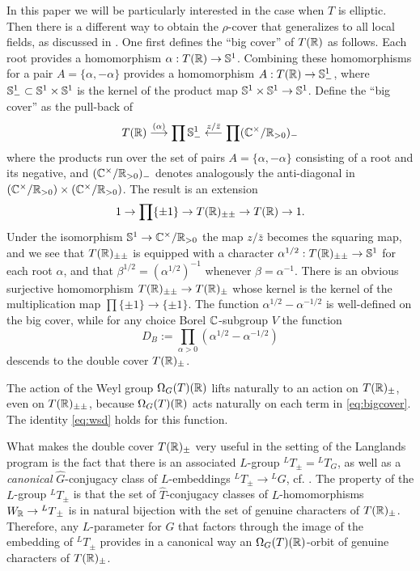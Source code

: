 \documentclass{article}
\theoremstyle{definition}
\numberwithin{equation}{section}
\renewcommand{\-}{\hyp{}}
\begin{document}
In this paper we will be particularly interested in the case when $T$ is elliptic. Then there is a different way to obtain the $\rho$-cover that generalizes to all local fields, as discussed in \cite{KalDC}. One first defines the ``big cover'' of $T(\mathbb{R})$ as follows. Each root provides a homomorphism $\alpha : T(\mathbb{R}) \to \mathbb{S}^1$. Combining these homomorphisms for a pair $A=\{\alpha,-\alpha\}$ provides a homomorphism $A : T(\mathbb{R}) \to \mathbb{S}^1_-$, where $\mathbb{S}^1_- \subset \mathbb{S}^1 \times \mathbb{S}^1$ is the kernel of the product map $\mathbb{S}^1 \times \mathbb{S}^1 \to \mathbb{S}^1$. Define the ``big cover'' as the pull-back of
\begin{equation} \label{eq:bigcover}
T(\mathbb{R}) \stackrel{(\alpha)}{\longrightarrow} \prod \mathbb{S}^1_- \stackrel{z/\bar z}{\longleftarrow} \prod(\mathbb{C}^\times/\mathbb{R}_{>0})_-
\end{equation}
where the products run over the set of pairs $A=\{\alpha,-\alpha\}$ consisting of a root and its negative, and $(\mathbb{C}^\times/\mathbb{R}_{>0})_-$ denotes analogously the anti-diagonal in $(\mathbb{C}^\times/\mathbb{R}_{>0}) \times (\mathbb{C}^\times/\mathbb{R}_{>0})$. The result is an extension
\[ 1 \to \prod\{\pm1\} \to T(\mathbb{R})_{\pm\pm} \to T(\mathbb{R}) \to 1. \]
Under the isomorphism $\mathbb{S}^1 \to \mathbb{C}^\times/\mathbb{R}_{>0}$ the map $z/\bar z$ becomes the squaring map, and we see that $T(\mathbb{R})_{\pm\pm}$ is equipped with a character $\alpha^{1/2} : T(\mathbb{R})_{\pm\pm} \to \mathbb{S}^1$ for each root $\alpha$, and that $\beta^{1/2}=(\alpha^{1/2})^{-1}$ whenever $\beta=\alpha^{-1}$. There is an obvious surjective homomorphism $T(\mathbb{R})_{\pm\pm} \to T(\mathbb{R})_\pm$ whose kernel is the kernel of the multiplication map $\prod\{\pm1\} \to \{\pm1\}$. The function $\alpha^{1/2}-\alpha^{-1/2}$ is well-defined on the big cover, while for any choice Borel $\mathbb{C}$-subgroup $V$ the function
\[ D_B := \prod_{\alpha>0}(\alpha^{1/2}-\alpha^{-1/2}) \]
descends to the double cover $T(\mathbb{R})_\pm$.

The action of the Weyl group $\Omega_G(T)(\mathbb{R})$ lifts naturally to an action on $T(\mathbb{R})_\pm$, even on $T(\mathbb{R})_{\pm\pm}$, because $\Omega_G(T)(\mathbb{R})$ acts naturally on each term in \eqref{eq:bigcover}. The identity \eqref{eq:wsd} holds for this function.

What makes the double cover $T(\mathbb{R})_\pm$ very useful in the setting of the Langlands program is the fact that there is an associated $L$\-group ${^LT}_\pm={^LT}_G$, as well as a \emph{canonical} $\hat G$-conjugacy class of $L$\-embeddings $^LT_\pm \to {^LG}$, cf. \cite[\S4.1]{KalDC}. The property of the $L$\-group $^LT_\pm$ is that the set of $\hat T$-conjugacy classes of $L$\-homomorphisms $W_{\mathbb{R}} \to {^LT}_\pm$ is in natural bijection with the set of genuine characters of $T(\mathbb{R})_\pm$. Therefore, any $L$\-parameter for $G$ that factors through the image of the embedding of $^LT_\pm$ provides in a canonical way an $\Omega_G(T)(\mathbb{R})$-orbit of genuine characters of $T(\mathbb{R})_\pm$.
\end{document}
